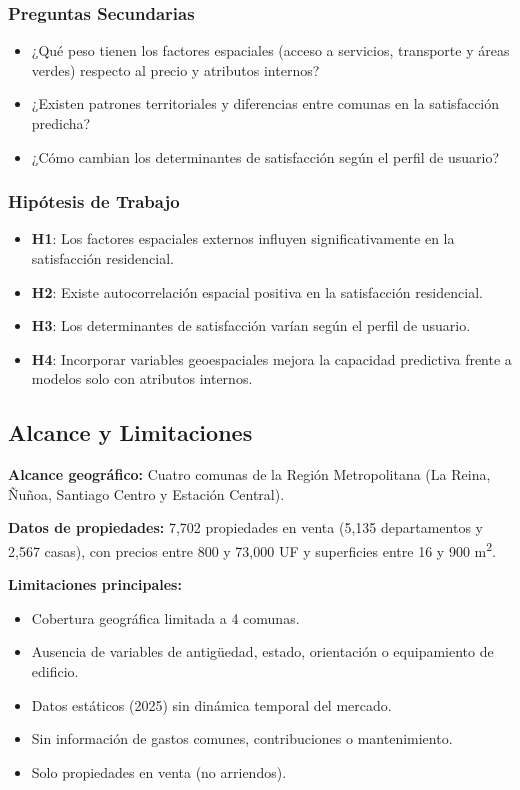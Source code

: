 \documentclass[11pt,letterpaper]{article}
\begin{document}
\subsubsection{Preguntas Secundarias}
\begin{itemize}
    \item ¿Qué peso tienen los factores espaciales (acceso a servicios, transporte y áreas verdes) respecto al precio y atributos internos?
    \item ¿Existen patrones territoriales y diferencias entre comunas en la satisfacción predicha?
    \item ¿Cómo cambian los determinantes de satisfacción según el perfil de usuario?
\end{itemize}

\subsubsection{Hipótesis de Trabajo}
\begin{itemize}
    \item \textbf{H1}: Los factores espaciales externos influyen significativamente en la satisfacción residencial.
    \item \textbf{H2}: Existe autocorrelación espacial positiva en la satisfacción residencial.
    \item \textbf{H3}: Los determinantes de satisfacción varían según el perfil de usuario.
    \item \textbf{H4}: Incorporar variables geoespaciales mejora la capacidad predictiva frente a modelos solo con atributos internos.
\end{itemize}

\subsection{Alcance y Limitaciones}
\textbf{Alcance geográfico:} Cuatro comunas de la Región Metropolitana (La Reina, Ñuñoa, Santiago Centro y Estación Central).

\textbf{Datos de propiedades:} 7,702 propiedades en venta (5,135 departamentos y 2,567 casas), con precios entre 800 y 73,000 UF y superficies entre 16 y 900 m\textsuperscript{2}.

\textbf{Limitaciones principales:}
\begin{itemize}
    \item Cobertura geográfica limitada a 4 comunas.
    \item Ausencia de variables de antigüedad, estado, orientación o equipamiento de edificio.
    \item Datos estáticos (2025) sin dinámica temporal del mercado.
    \item Sin información de gastos comunes, contribuciones o mantenimiento.
    \item Solo propiedades en venta (no arriendos).
\end{itemize}
\end{document}
